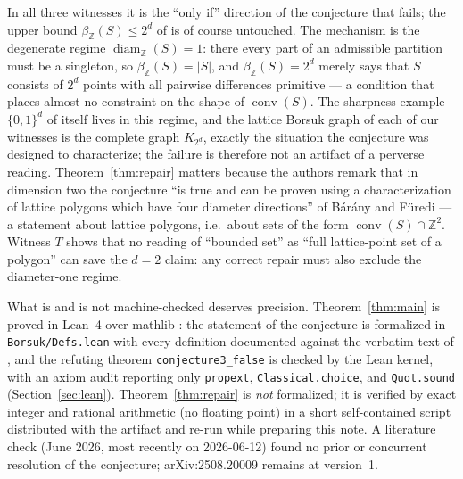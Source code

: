 \documentclass[11pt]{article}
\theoremstyle{remark}
\newcommand{\Z}{\mathbb{Z}}
\newcommand{\conv}{\operatorname{conv}}
\newcommand{\diamZ}{\operatorname{diam}_{\Z}}
\newcommand{\betaZ}{\beta_{\Z}}
\begin{document}
In all three witnesses it is the ``only if'' direction of the conjecture that
fails; the upper bound $\betaZ(S) \leq 2^d$ of \cite[Theorem~4.8]{BDLT2025}
is of course untouched. The mechanism is the degenerate regime
$\diamZ(S) = 1$: there every part of an admissible partition must be a
singleton, so $\betaZ(S) = |S|$, and $\betaZ(S) = 2^d$ merely says that $S$
consists of $2^d$ points with all pairwise differences primitive --- a
condition that places almost no constraint on the shape of $\conv(S)$. The
sharpness example $\{0,1\}^d$ of \cite[Theorem~4.8]{BDLT2025} itself lives in
this regime, and the lattice Borsuk graph of each of our witnesses is the
complete graph $K_{2^d}$, exactly the situation the conjecture was designed
to characterize; the failure is therefore not an artifact of a perverse
reading. Theorem~\ref{thm:repair} matters because the authors remark
\cite[\S 4.2]{BDLT2025} that in dimension two the conjecture ``is true and
can be proven using a characterization of lattice polygons which have four
diameter directions'' of B\'ar\'any and F\"uredi \cite[Theorem~2(iii)]
{BaranyFuredi2001} --- a statement about lattice polygons, i.e.\ about sets
of the form $\conv(S) \cap \Z^2$. Witness $T$ shows that no reading of
``bounded set'' as ``full lattice-point set of a polygon'' can save the
$d = 2$ claim: any correct repair must also exclude the diameter-one regime.

What is and is not machine-checked deserves precision.
Theorem~\ref{thm:main} is proved in Lean~4 \cite{Lean4} over mathlib
\cite{mathlib}: the statement of the conjecture is formalized in
\texttt{Borsuk/Defs.lean} with every definition documented against the
verbatim text of \cite{BDLT2025}, and the refuting theorem
\texttt{conjecture3\_false} is checked by the Lean kernel, with an axiom
audit reporting only \texttt{propext}, \texttt{Classical.choice}, and
\texttt{Quot.sound} (Section~\ref{sec:lean}). Theorem~\ref{thm:repair} is \emph{not} formalized;
it is verified by exact integer and rational arithmetic (no floating point)
in a short self-contained script distributed with the artifact and re-run
while preparing this note. A literature check (June 2026, most recently on
2026-06-12) found no prior or concurrent resolution of the conjecture;
arXiv:2508.20009 remains at version~1.
\end{document}
